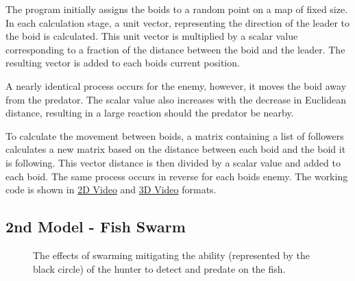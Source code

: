 \documentclass[
reprint,
showpacs,
preprintnumbers,
bibnotes,
amsmath,
amssymb,
aps,
pra,
floatfix,
]{revtex4-1}
\begin{document}
The program initially assigns the boids to a random point on a map of fixed size.
In each calculation stage, a unit vector, representing the direction of the leader to the boid is calculated.
This unit vector is multiplied by a scalar value corresponding to a fraction of the distance between the boid and the leader.
The resulting vector is added to each boids current position.

A nearly identical process occurs for the enemy, however, it moves the boid away from the predator.
The scalar value also increases with the decrease in Euclidean distance, resulting in a large reaction should the predator be nearby.

To calculate the movement between boids, a matrix containing a list of followers calculates a new matrix based on the distance between each boid and the boid it is following.
This vector distance is then divided by a scalar value and added to each boid.
The same process occurs in reverse for each boids enemy.
The working code is shown in \href{https://youtu.be/EyhdRhi5Gnc}{2D Video} and \href{https://youtu.be/KG7qQum6EUc}{3D Video} formats.

\subsection{\label{sec:fishswarm}2nd Model - Fish Swarm}

\begin{figure}[]
		\centering

	\caption{The effects of swarming mitigating the ability (represented by the black circle) of the hunter to detect and predate on the fish.\cite{underwatervision}}

	\label{fig:swarmblindness}
\end{figure}
\end{document}
